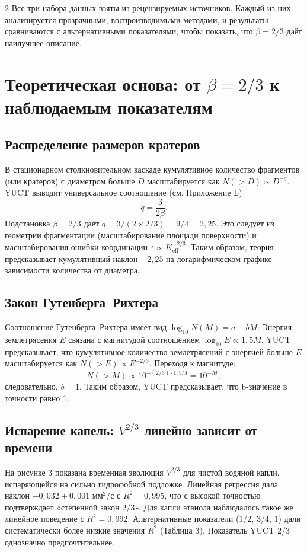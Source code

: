 \documentclass[11pt,a4paper]{article}
\newcommand{\eps}{\varepsilon}
\newcommand{\Keff}{K_{\mathrm{eff}}}
\newcommand{\betaf}{\beta}
\begin{document}
\begin{multicols}{2}
		Все три набора данных взяты из рецензируемых источников. Каждый из них анализируется прозрачными, воспроизводимыми методами, и результаты сравниваются с альтернативными показателями, чтобы показать, что \(\betaf = 2/3\) даёт наилучшее описание.
		
		\section{Теоретическая основа: от \(\betaf = 2/3\) к наблюдаемым показателям}
		
		\subsection{Распределение размеров кратеров}
		
		В стационарном столкновительном каскаде кумулятивное количество фрагментов (или кратеров) с диаметром больше \(D\) масштабируется как \(N(>D) \propto D^{-q}\). YUCT выводит универсальное соотношение (см. Приложение L)
		\[
		q = \frac{3}{2\betaf}.
		\]
		Подстановка \(\betaf = 2/3\) даёт \(q = 3/(2 \times 2/3) = 9/4 = 2,25\). Это следует из геометрии фрагментации (масштабирование площади поверхности) и масштабирования ошибки координации \(\eps \propto \Keff^{-2/3}\). Таким образом, теория предсказывает кумулятивный наклон \(-2,25\) на логарифмическом графике зависимости количества от диаметра.
		
		\subsection{Закон Гутенберга–Рихтера}
		
		Соотношение Гутенберга–Рихтера \cite{GutenbergRichter1954} имеет вид \(\log_{10} N(M) = a - b M\). Энергия землетрясения \(E\) связана с магнитудой соотношением \(\log_{10} E \propto 1,5 M\). YUCT предсказывает, что кумулятивное количество землетрясений с энергией больше \(E\) масштабируется как \(N(>E) \propto E^{-2/3}\). Переходя к магнитуде:
		\[
		N(>M) \propto 10^{-(2/3) \cdot 1,5 M} = 10^{-M},
		\]
		следовательно, \(b = 1\). Таким образом, YUCT предсказывает, что b-значение в точности равно 1.
		
		\subsection{Испарение капель: \(V^{2/3}\) линейно зависит от времени}
		
		На рисунке 3 показана временная эволюция \(V^{2/3}\) для чистой водяной капли, испаряющейся на сильно гидрофобной подложке. Линейная регрессия дала наклон \(-0,032 \pm 0,001\) мм\(^2\)/с с \(R^2 = 0,995\), что с высокой точностью подтверждает «степенной закон 2/3». Для капли этанола наблюдалось такое же линейное поведение с \(R^2 = 0,992\). Альтернативные показатели (1/2, 3/4, 1) дали систематически более низкие значения \(R^2\) (Таблица 3). Показатель YUCT 2/3 однозначно предпочтительнее.
		

\end{multicols}
\end{document}
